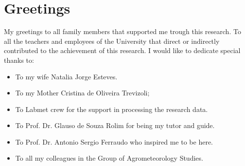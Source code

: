 \chapter*{Greetings}

\vspace*{-0.5cm}

My greetings to all family members that supported me trough this research. To all the teachers and employees of the University that direct or indirectly contributed to the achievement of this research. I would like to dedicate special thanks to:

\begin{itemize}
	\item To my wife Natalia Jorge Esteves.
	\item To my Mother Cristina de Oliveira Trevizoli;
	\item To Labmet crew for the support in processing the research data.
	\item To Prof. Dr. Glauso de Souza Rolim for being my tutor and guide.
	\item To Prof. Dr. Antonio Sergio Ferraudo who inspired me to be here.
	\item To all my colleagues in the Group of Agrometeorology Studies.
\end{itemize} 
